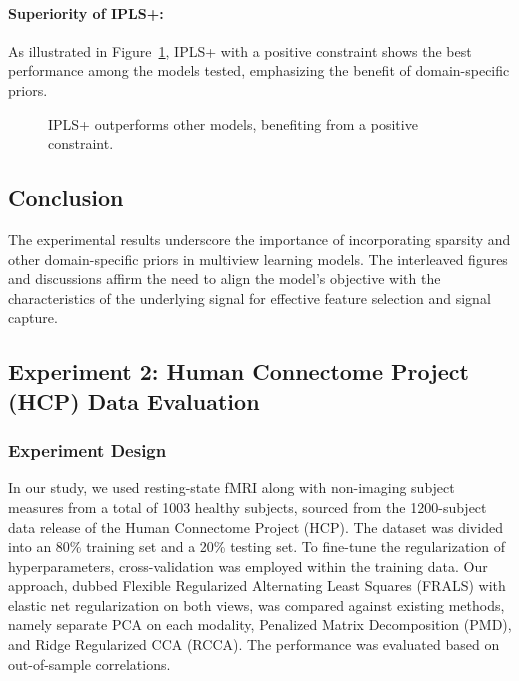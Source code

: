\paragraph{Superiority of IPLS+:}
As illustrated in Figure~\ref{fig:IPLS+_weights}, IPLS+ with a positive constraint shows the best performance among the models tested, emphasizing the benefit of domain-specific priors.

\begin{figure}[h]
    \centering
    
    \caption{IPLS+ outperforms other models, benefiting from a positive constraint.}
    \label{fig:IPLS+_weights}
\end{figure}

\subsection{Conclusion}

The experimental results underscore the importance of incorporating sparsity and other domain-specific priors in multiview learning models.
The interleaved figures and discussions affirm the need to align the model's objective with the characteristics of the underlying signal for effective feature selection and signal capture.




\subsection{Experiment 2: Human Connectome Project (HCP) Data Evaluation}

\subsubsection{Experiment Design}
In our study, we used resting-state fMRI along with non-imaging subject measures from a total of 1003 healthy subjects, sourced from the 1200-subject data release of the Human Connectome Project (HCP). The dataset was divided into an 80\% training set and a 20\% testing set.
To fine-tune the regularization of hyperparameters, cross-validation was employed within the training data.
Our approach, dubbed Flexible Regularized Alternating Least Squares (FRALS) with elastic net regularization on both views, was compared against existing methods, namely separate PCA on each modality, Penalized Matrix Decomposition (PMD), and Ridge Regularized CCA (RCCA). The performance was evaluated based on out-of-sample correlations.

